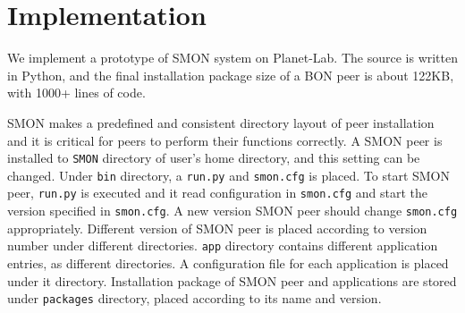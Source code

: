 \section{Implementation}
\label{sec:impl}

We implement a prototype of SMON system on Planet-Lab.  The
source is written in Python, and the final installation
package size of a BON peer is about 122KB, with 1000+ lines
of code.

SMON makes a predefined and consistent directory layout of
peer installation and it is critical for peers to perform
their functions correctly. A SMON peer is installed to
\texttt{SMON} directory of user's home directory, and this
setting can be changed. Under \texttt{bin} directory, a
\texttt{run.py} and \texttt{smon.cfg} is placed. To start
SMON peer, \texttt{run.py} is executed and it read
configuration in \texttt{smon.cfg} and start the version
specified in \texttt{smon.cfg}. A new version SMON peer
should change \texttt{smon.cfg} appropriately. Different
version of SMON peer is placed according to version number
under different directories. \texttt{app} directory contains
different application entries, as different directories. A
configuration file for each application is placed under it
directory. Installation package of SMON peer and
applications are stored under \texttt{packages} directory,
placed according to its name and version.


